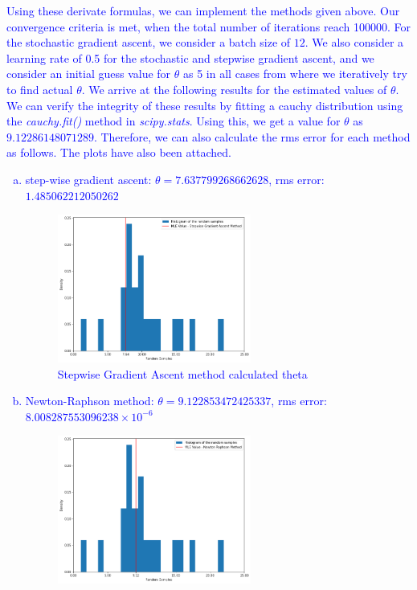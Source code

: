 \documentclass[11pt]{article}
\begin{document}
\textcolor{blue}{Using these derivate formulas, we can implement the methods given above. Our convergence criteria is met, when the total number of iterations reach 100000. For the stochastic gradient ascent, we consider a batch size of $12$. We also consider a learning rate of 0.5 for the stochastic and stepwise gradient ascent, and we consider an initial guess value for $\theta$ as 5 in all cases from where we iteratively try to find actual $\theta$. We arrive at the following results for the estimated values of $\theta$. We can verify the integrity of these results by fitting a cauchy distribution using the \emph{cauchy.fit()} method in \emph{scipy.stats}. Using this, we get a value for $\theta$ as $9.12286148071289$. Therefore, we can also calculate the rms error for each method as follows. The plots have also been attached.
\begin{enumerate}[a.]
  \item step-wise gradient ascent: $\theta = 7.637799268662628$, rms error: $1.485062212050262$
  \begin{figure}[H]
    \centering
    \includegraphics[width = 0.6\textwidth]{q3stepgrad.png}
    \caption{Stepwise Gradient Ascent method calculated theta}
  \end{figure}
  \item Newton-Raphson method: $\theta = 9.122853472425337$, rms error: $8.008287553096238 \times 10^{-6}$
  \begin{figure}[H]
    \centering
    \includegraphics[width = 0.6\textwidth]{q3newtonraphson.png}

\end{figure}
\end{enumerate}}
\end{document}
